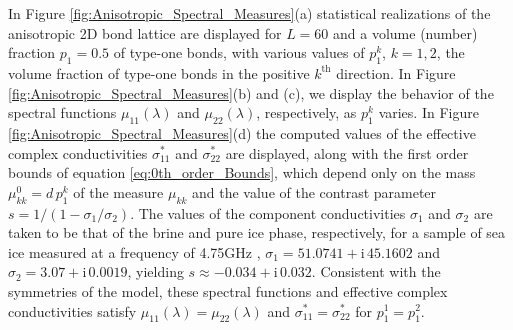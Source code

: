 \documentclass{cmslatex}
\newcommand{\I}{\mathrm{i}}
\begin{document}
In Figure
\ref{fig:Anisotropic_Spectral_Measures}(a) statistical 
realizations of the anisotropic 2D bond lattice are displayed for
$L=60$ and a volume (number) fraction $p_1=0.5$ of type-one bonds,
with various values of $p_1^k$, $k=1,2$, the volume fraction of
type-one bonds in the positive $k^{\text{th}}$ direction. In Figure
\ref{fig:Anisotropic_Spectral_Measures}(b) and (c), we display the
behavior of the spectral functions $\mu_{11}(\lambda)$ and $\mu_{22}(\lambda)$,
respectively, as $p_1^k$ varies. In Figure
\ref{fig:Anisotropic_Spectral_Measures}(d) the computed values of the
effective complex conductivities $\sigma^*_{11}$ and $\sigma^*_{22}$ are   
displayed, along with the first order bounds of equation
\eqref{eq:0th_order_Bounds}, which depend only on the mass
$\mu^0_{kk}=d\,p_1^k$ of the measure $\mu_{kk}$ and the value of the contrast parameter
$s=1/(1-\sigma_1/\sigma_2)$. The values of the component conductivities $\sigma_1$
and $\sigma_2$ are taken to be that of the brine and pure ice phase,
respectively, for a sample of sea ice measured at a frequency of
4.75GHz \cite{Backstrom:2007:Book}, $\sigma_1=51.0741+\I\,45.1602$ and 
$\sigma_2=3.07+\I\,0.0019$, yielding
$s\approx-0.034+\I\,0.032$. Consistent with the symmetries of
the model, these spectral functions and effective complex
conductivities satisfy $\mu_{11}(\lambda)=\mu_{22}(\lambda)$ and $\sigma^*_{11}=\sigma^*_{22}$
for $p_1^1=p_1^2$. 
\end{document}
